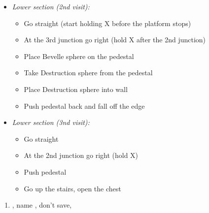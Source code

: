 \begin{trial}
\begin{itemize}
\begin{itemize}
            \item Push pedestal back and fall off the edge
        \end{itemize}
        \item \textit{Lower section (2nd visit):}
        \begin{itemize}
            \item Go straight (start holding X before the platform stops)
            \item At the 3rd junction go right (hold X after the 2nd junction)
            \item Place Bevelle sphere on the pedestal
            \item Take Destruction sphere from the pedestal
            \item Place Destruction sphere into wall
            \item Push pedestal back and fall off the edge
        \end{itemize}
        \item \textit{Lower section (3nd visit):}
        \begin{itemize}
            \item Go straight
            \item At the 2nd junction go right (hold X)
            \item Push pedestal
            \item Go up the stairs, open the chest
        \end{itemize}
    \end{itemize}
\end{trial}
\begin{enumerate}[resume]
    \item \sd, name \bahamut, don't save, \sd
\end{enumerate}
\bothcb\winnp\losscb\bothnpsingle\winnpsingle\lossnpsingle
